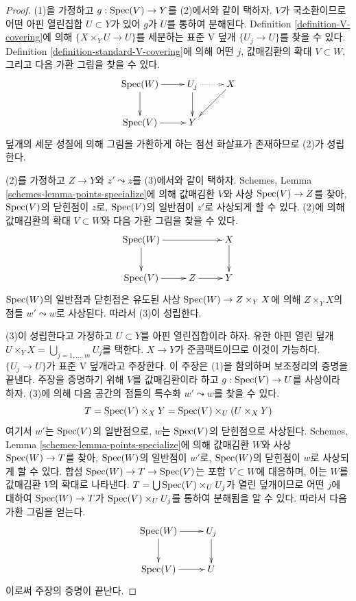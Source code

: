 \begin{proof}
(1)을 가정하고 $g : \mathop{\mathrm{Spec}}(V) \to Y$를 (2)에서와 같이 택하자. $V$가
국소환이므로 어떤 아핀 열린집합 $U \subset Y$가 있어 $g$가 $U$를 통하여
분해된다.
Definition \ref{definition-V-covering}에 의해 $\{X \times_Y U \to U\}$를
세분하는 표준 V 덮개 $\{U_j \to U\}$를 찾을 수 있다. Definition
\ref{definition-standard-V-covering}에 의해 어떤 $j$, 값매김환의 확대
$V \subset W$, 그리고 다음 가환 그림을 찾을 수 있다.
$$
\xymatrix{
\Spec(W) \ar[r] \ar[d] & U_j \ar[d] \ar@{..>}[r] & X \ar[ld] \\
\Spec(V) \ar[r] & Y
}
$$
덮개의 세분 성질에 의해 그림을 가환하게 하는 점선 화살표가 존재하므로
(2)가 성립한다.

\medskip\noindent
(2)를 가정하고 $Z \to Y$와 $z' \leadsto z$를 (3)에서와 같이 택하자.
Schemes, Lemma \ref{schemes-lemma-points-specialize}에 의해 값매김환 $V$와
사상 $\mathop{\mathrm{Spec}}(V) \to Z$를 찾아, $\mathop{\mathrm{Spec}}(V)$의 닫힌점이 $z$로,
$\mathop{\mathrm{Spec}}(V)$의 일반점이 $z'$로 사상되게 할 수 있다. (2)에 의해 값매김환의
확대 $V \subset W$와
다음 가환 그림을 찾을 수 있다.
$$
\xymatrix{
\Spec(W) \ar[rr] \ar[d] & & X \ar[d] \\
\Spec(V) \ar[r] & Z \ar[r] & Y
}
$$
$\mathop{\mathrm{Spec}}(W)$의 일반점과 닫힌점은 유도된 사상
$\mathop{\mathrm{Spec}}(W) \to Z \times_Y X$에 의해 $Z \times_Y X$의 점들
$w' \leadsto w$로 사상된다. 따라서 (3)이 성립한다.

\medskip\noindent
(3)이 성립한다고 가정하고 $U \subset Y$를 아핀 열린집합이라 하자. 유한
아핀 열린 덮개 $U \times_Y X = \bigcup_{j = 1, \ldots, m} U_j$를 택한다.
$X \to Y$가 준콤팩트이므로 이것이 가능하다. $\{U_j \to U\}$가 표준 V
덮개라고 주장한다. 이 주장은 (1)을 함의하며 보조정리의 증명을 끝낸다.
주장을 증명하기 위해 $V$를 값매김환이라 하고
$g : \mathop{\mathrm{Spec}}(V) \to U$를 사상이라 하자. (3)에 의해 다음 공간의 점들의 특수화
$w' \leadsto w$를 찾을 수 있다.
$$
T = \mathop{\mathrm{Spec}}(V) \times_X Y = \mathop{\mathrm{Spec}}(V) \times_U (U \times_X Y)
$$
여기서 $w'$는 $\mathop{\mathrm{Spec}}(V)$의 일반점으로, $w$는 $\mathop{\mathrm{Spec}}(V)$의 닫힌점으로
사상된다. Schemes, Lemma \ref{schemes-lemma-points-specialize}에 의해
값매김환 $W$와 사상 $\mathop{\mathrm{Spec}}(W) \to T$를 찾아, $\mathop{\mathrm{Spec}}(W)$의 일반점이
$w'$로, $\mathop{\mathrm{Spec}}(W)$의 닫힌점이 $w$로 사상되게 할 수 있다. 합성
$\mathop{\mathrm{Spec}}(W) \to T \to \mathop{\mathrm{Spec}}(V)$는 포함 $V \subset W$에 대응하며, 이는
$W$를 값매김환 $V$의 확대로 나타낸다.
$T = \bigcup \mathop{\mathrm{Spec}}(V) \times_U U_j$가 열린 덮개이므로 어떤 $j$에 대하여
$\mathop{\mathrm{Spec}}(W) \to T$가 $\mathop{\mathrm{Spec}}(V) \times_U U_j$를 통하여 분해됨을 알 수 있다.
따라서 다음 가환 그림을 얻는다.
$$
\xymatrix{
\Spec(W) \ar[d] \ar[r] & U_j \ar[d] \\
\Spec(V) \ar[r] & U
}
$$
이로써 주장의 증명이 끝난다.
\end{proof}

